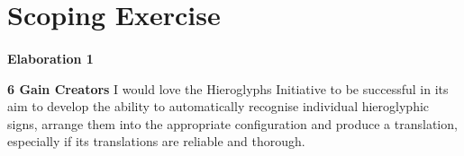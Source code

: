 \documentclass{article}
\author{Bree Kelly} \date{}
\begin{document}
\maketitle

\section*{Scoping Exercise}

\paragraph{} \noindent \large \break
\textbf{Elaboration 1}
\newline \break



\newpage \noindent
\textbf{6 Gain Creators}
\newline \break
I would love the Hieroglyphs Initiative to be successful in its aim to develop the ability to automatically recognise individual hieroglyphic signs, arrange them into the appropriate configuration and produce a translation, especially if its translations are reliable and thorough.
\end{document}
